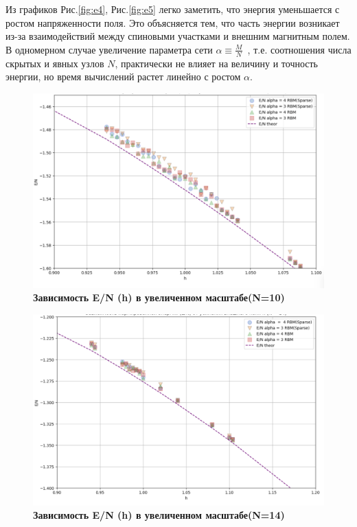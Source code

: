 Из графиков Рис.\ref{fig:e4}, Рис.\ref{fig:e5} легко заметить, что энергия уменьшается с ростом напряженности поля. Это объясняется тем, что часть энергии возникает из-за взаимодействий между спиновыми участками и внешним магнитным полем. В одномерном случае увеличение параметра сети \(\alpha \equiv \frac{M}{N}\)\ , т.е. соотношения числа скрытых и явных узлов \(N\), практически не влияет на величину и точность энергии, но время вычислений растет линейно с ростом \(\alpha\).


\begin{figure}[H]
    \centering
    \includegraphics[width=0.8\linewidth]{Course_work/Images/E-N-10-z.png}
    \caption{\textbf{Зависимость E/N (h) в увеличенном масштабе(N=10)}}
    \label{fig:e2}
\end{figure}

\begin{figure}[H]
    \centering
    \includegraphics[width=0.8\linewidth]{Course_work/Images/E-N-14-z.png}
    \caption{\textbf{Зависимость E/N (h) в увеличенном масштабе(N=14)}}
    \label{fig:e3}
\end{figure}

%


